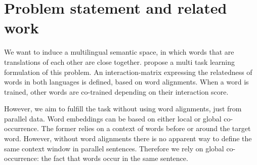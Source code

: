 \documentclass[a4paper,11pt]{article}
\begin{document}









\section*{Problem statement and related work}



We want to induce a multilingual semantic space, in which words that are translations of each other are close together. 
\cite{klementiev2012inducing} propose a multi task learning formulation of this problem. An interaction-matrix expressing the relatedness of words in both languages is defined, based on word alignments. When a word is trained, other words are co-trained depending on their interaction score.

However, we aim to fulfill the task without using word alignments, just from parallel data. Word embeddings can be based on either local or global co-occurrence. The former relies on a context of words before or around the target word. However, without word alignments there is no apparent way to define the same context window in parallel sentences. Therefore we rely on global co-occurrence: the fact that words occur in the same sentence. 
\end{document}
